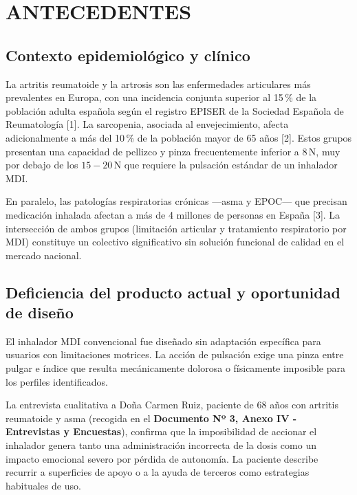 \documentclass[11pt,a4paper]{article}
\begin{document}
\section{ANTECEDENTES}

\subsection{Contexto epidemiológico y clínico}

La artritis reumatoide y la artrosis son las enfermedades articulares más prevalentes en Europa, con una incidencia conjunta superior al 15\,\% de la población adulta española según el registro EPISER de la Sociedad Española de Reumatología [1]. La sarcopenia, asociada al envejecimiento, afecta adicionalmente a más del 10\,\% de la población mayor de 65 años [2]. Estos grupos presentan una capacidad de pellizco y pinza frecuentemente inferior a $8\,\text{N}$, muy por debajo de los $15{-}20\,\text{N}$ que requiere la pulsación estándar de un inhalador MDI.

En paralelo, las patologías respiratorias crónicas —asma y EPOC— que precisan medicación inhalada afectan a más de 4 millones de personas en España [3]. La intersección de ambos grupos (limitación articular y tratamiento respiratorio por MDI) constituye un colectivo significativo sin solución funcional de calidad en el mercado nacional.

\subsection{Deficiencia del producto actual y oportunidad de diseño}

El inhalador MDI convencional fue diseñado sin adaptación específica para usuarios con limitaciones motrices. La acción de pulsación exige una pinza entre pulgar e índice que resulta mecánicamente dolorosa o físicamente imposible para los perfiles identificados.

La entrevista cualitativa a Doña Carmen Ruiz, paciente de 68 años con artritis reumatoide y asma (recogida en el \textbf{Documento Nº 3, Anexo IV - Entrevistas y Encuestas}), confirma que la imposibilidad de accionar el inhalador genera tanto una administración incorrecta de la dosis como un impacto emocional severo por pérdida de autonomía. La paciente describe recurrir a superficies de apoyo o a la ayuda de terceros como estrategias habituales de uso.
\end{document}
